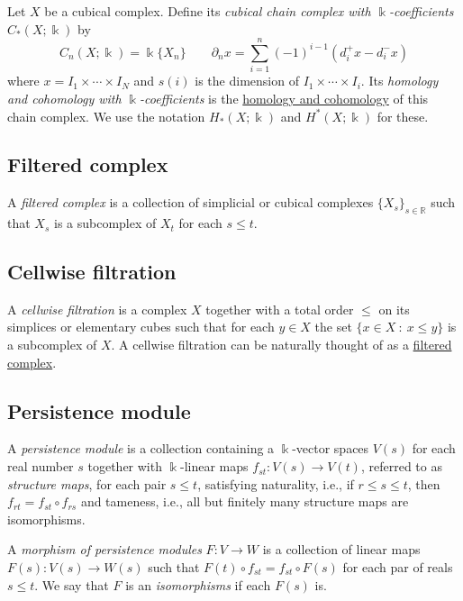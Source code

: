 \documentclass{amsart}
\begin{document}
	Let $X$ be a cubical complex. Define its \textit{cubical chain complex with $\Bbbk$-coefficients} $C_*(X; \Bbbk)$ by 
	\begin{equation*}
	C_n(X; \Bbbk) = \Bbbk\{X_n\} \qquad \partial_n x = \sum_{i = 1}^{n} (-1)^{i-1}(d^+_i x - d^-_i x)
	\end{equation*}
	where $x = I_1 \times \cdots \times I_N$ and $s(i)$ is the dimension of $I_1 \times \cdots \times I_i$.
	Its \textit{homology and cohomology with $\Bbbk$-coefficients} is the \hyperref[homology and cohomology]{homology and cohomology} of this chain complex. We use the notation $H_*(X; \Bbbk)$ and $H^*(X; \Bbbk)$ for these.
	
	\subsection*{Filtered complex} \label{filtered complex}
	
	A \textit{filtered complex} is a collection of simplicial or cubical complexes $\{X_s\}_{s \in \mathbb R}$ such that $X_s$ is a subcomplex of $X_t$ for each $s \leq t$.
	
	\subsection*{Cellwise filtration} \label{cellwise filtration}
	
	A \textit{cellwise filtration} is a complex $X$ together with a total order $\leq$ on its simplices or elementary cubes such that for each $y \in X$ the set $\{x \in X\ :\ x \leq y\}$ is a subcomplex of $X$. A cellwise filtration can be naturally thought of as a \hyperref[filtered complex]{filtered complex}.
	
	\subsection*{Persistence module} \label{persistence module}
	
	A \textit{persistence module} is a collection containing a $\Bbbk$-vector spaces $V(s)$ for each real number $s$ together with $\Bbbk$-linear maps $f_{st} : V(s) \to V(t)$, referred to as \textit{structure maps}, for each pair $s \leq t$, satisfying	naturality, i.e., if $r \leq s \leq t$, then $f_{rt} = f_{st} \circ f_{rs}$ and tameness, i.e., all but finitely many structure maps are isomorphisms.
	
	A \textit{morphism of persistence modules} $F : V \to W$ is a collection of linear maps $F(s) : V(s) \to W(s)$ such that $F(t) \circ f_{st} = f_{st} \circ F(s)$ for each par of reals $s \leq t$.	We say that $F$ is an \textit{isomorphisms} if each $F(s)$ is.
	
\end{document}
